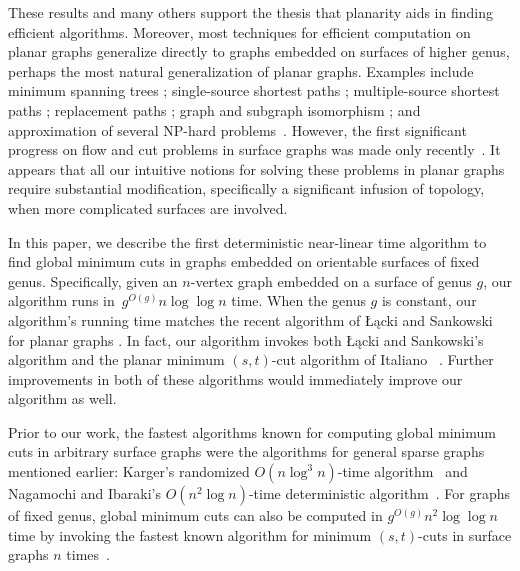 \documentclass[twoside,leqno,twocolumn]{article}
\begin{document}
These results and many others support the thesis that planarity aids in finding efficient algorithms.  Moreover, most techniques for efficient computation on planar graphs generalize directly to graphs embedded on surfaces of higher genus, perhaps the most natural generalization of planar graphs.  Examples include minimum spanning trees \cite{p-omst-99, m-tltam-04}; single-source shortest paths \cite{cen-hfcc-09, hkrs-fspap-97, kmw-spdpg-09, lrt-gnd-79, mw-sppgr-10, tm-spltm-09}; multiple-source shortest paths \cite{cc-msspg-07, k-msspp-05}; replacement paths \cite{en-crpsg-11, w-srppp-10}; graph and subgraph isomorphism \cite{g-itegd-00, hw-ltaip-74, m-itgbg-80, e-sipgr-99, e-dtmcg-00}; and approximation of several NP-hard problems~\cite{bdt-ptass-08, bkk-ptass-07, bkk-stpg-07, dhm-aacd-07, e-dtmcg-00}.  However, the first significant progress on flow and cut problems in surface graphs was made only recently~\cite{cen-hfcc-09, cen-mcshc-09, en-mcsnc-11}.  It appears that all our intuitive notions for solving these problems in planar graphs require substantial modification, specifically a significant infusion of topology, when more complicated surfaces are involved.

In this paper, we describe the first deterministic near-linear time algorithm to find global minimum cuts in graphs embedded on orientable surfaces of fixed genus.  Specifically, given an $n$-vertex graph embedded on a surface of genus $g$, our algorithm runs in~$g^{O(g)}n \log \log n$ time.  When the genus $g$ is constant, our algorithm’s running time matches the recent algorithm of Łącki and Sankowski for planar graphs \cite{ls-mcsc-11}.  In fact, our algorithm invokes both Łącki and Sankowski's algorithm and the planar minimum $(s,t)$-cut algorithm of Italiano \etal~\cite{insw-iamcmf-11}.  Further improvements in both of these algorithms would  immediately improve our algorithm as well.

Prior to our work, the fastest algorithms known for computing global minimum cuts in arbitrary surface graphs were the algorithms for general sparse graphs mentioned earlier: Karger’s randomized $O(n \log^3 n)$-time algorithm~\cite{k-mcnlt-00} and Nagamochi and Ibaraki’s $O(n^2 \log n)$-time deterministic algorithm~\cite{ni-cemcg-92}.  For graphs of fixed genus, global minimum cuts can also be computed in 
$g^{O(g)} n^2 \log \log n$ time by invoking the fastest known algorithm for minimum $(s,t)$-cuts in surface graphs $n$ times~\cite{cen-mcshc-09, insw-iamcmf-11}.
\end{document}
